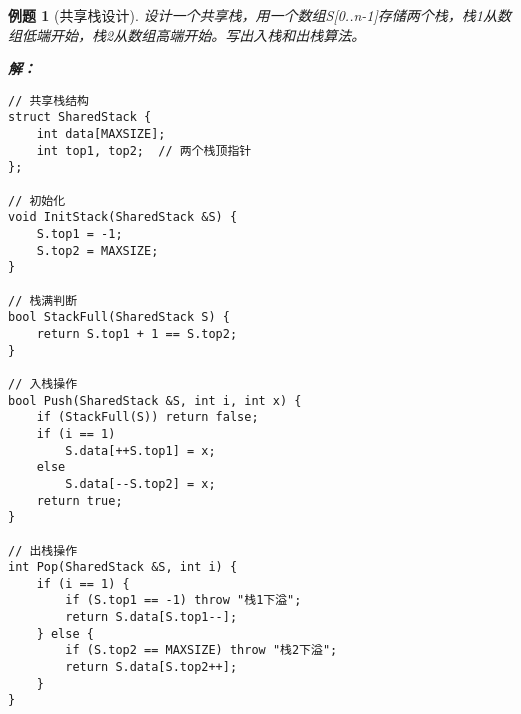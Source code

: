 \documentclass[12pt,a4paper]{amsart}
\newtheorem{example}{例题}[section]
\begin{document}
\begin{example}[共享栈设计]
设计一个共享栈，用一个数组S[0..n-1]存储两个栈，栈1从数组低端开始，栈2从数组高端开始。写出入栈和出栈算法。

\textbf{解：}
\begin{lstlisting}
// 共享栈结构
struct SharedStack {
    int data[MAXSIZE];
    int top1, top2;  // 两个栈顶指针
};

// 初始化
void InitStack(SharedStack &S) {
    S.top1 = -1;
    S.top2 = MAXSIZE;
}

// 栈满判断
bool StackFull(SharedStack S) {
    return S.top1 + 1 == S.top2;
}

// 入栈操作
bool Push(SharedStack &S, int i, int x) {
    if (StackFull(S)) return false;
    if (i == 1) 
        S.data[++S.top1] = x;
    else
        S.data[--S.top2] = x;
    return true;
}

// 出栈操作
int Pop(SharedStack &S, int i) {
    if (i == 1) {
        if (S.top1 == -1) throw "栈1下溢";
        return S.data[S.top1--];
    } else {
        if (S.top2 == MAXSIZE) throw "栈2下溢";
        return S.data[S.top2++];
    }
}
\end{lstlisting}
\end{example}
\end{document}
